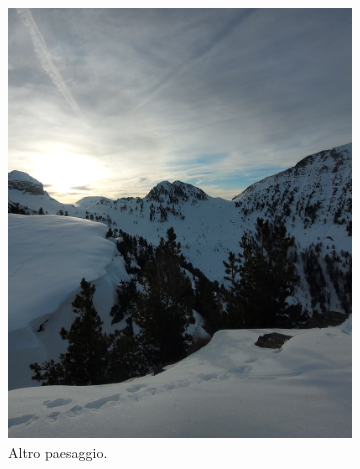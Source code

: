 \documentclass{article}
\begin{document}
\begin{figure}[H]
    \centering
    \begin{subfigure}[b]{0.45\textwidth}
        \includegraphics[width=\textwidth]{images/foto_paesaggio2.jpg}
        \caption{Altro paesaggio.}
    \end{subfigure}
    \hfill
    \begin{subfigure}[b]{0.45\textwidth}

\end{subfigure}
\end{figure}
\end{document}
